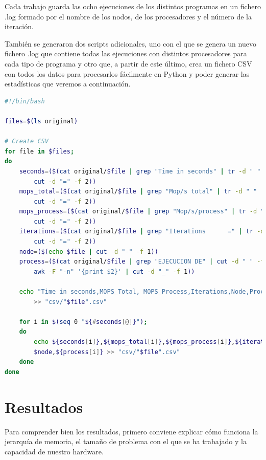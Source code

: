 Cada trabajo guarda las ocho ejecuciones de los distintos programas en un fichero .log formado por el nombre de los nodos, de los procesadores y el número de la iteración.
\vspace{2mm}

También se generaron dos scripts adicionales, uno con el que se genera un nuevo fichero .log que contiene todas las ejecuciones con distintos procesadores para cada tipo de programa y otro que, a partir de este último, crea un fichero CSV con todos los datos para procesarlos fácilmente en Python y poder generar las estadísticas que veremos a continuación.

\vspace{4mm}
\begin{lstlisting}[language=bash,showspaces=false,caption={Script generador\_csv.sh}]
#!/bin/bash

files=$(ls original)

# Create CSV
for file in $files; 
do
    seconds=($(cat original/$file | grep "Time in seconds" | tr -d " " |
        cut -d "=" -f 2))
    mops_total=($(cat original/$file | grep "Mop/s total" | tr -d " " |
        cut -d "=" -f 2))
    mops_process=($(cat original/$file | grep "Mop/s/process" | tr -d " " |
        cut -d "=" -f 2))
    iterations=($(cat original/$file | grep "Iterations      =" | tr -d " " |
        cut -d "=" -f 2))
    node=($(echo $file | cut -d "-" -f 1))
    process=($(cat original/$file | grep "EJECUCION DE" | cut -d " " -f 3 |
        awk -F "-n" '{print $2}' | cut -d "_" -f 1))
 
    echo "Time in seconds,MOPS_Total, MOPS_Process,Iterations,Node,Process"
        >> "csv/"$file".csv"
    
    for i in $(seq 0 "${#seconds[@]}"); 
    do 
        echo ${seconds[i]},${mops_total[i]},${mops_process[i]},${iterations[i]},
        $node,${process[i]} >> "csv/"$file".csv"
    done
done
\end{lstlisting}

\section{Resultados}

Para comprender bien los resultados, primero conviene explicar cómo funciona la jerarquía de memoria, el tamaño de problema con el que se ha trabajado y la capacidad de nuestro hardware.

